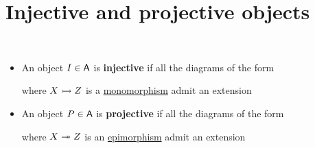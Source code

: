 \documentclass[../../../main]{subfiles}
\begin{document}
\section{Injective and projective objects}

\begin{definition} \label{def:injective-projective-object}~
  \begin{itemize}
    \item An object \(I \in \mathsf{A}\) is \textbf{injective} if all the diagrams of the form
          \begin{center}
          \end{center}
          where \(X \rightarrowtail Z\) is a \hyperref[def:mono-epi-morphism]{monomorphism} admit an extension
           \begin{center}
          \end{center}
    \item An object \(P \in \mathsf{A}\) is \textbf{projective} if all the diagrams of the form
          \begin{center}
          \end{center}
          where \(X \twoheadrightarrow Z\) is an \hyperref[def:mono-epi-morphism]{epimorphism} admit an extension
           \begin{center}
          \end{center}
  \end{itemize}
\end{definition}
\end{document}
